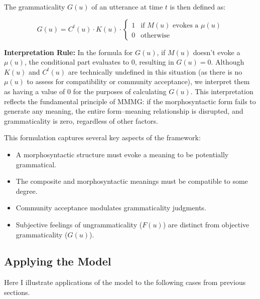 \documentclass[12pt,letterpaper]{article}
\begin{document}
The grammaticality \(G(u)\) of an utterance at time \(t\) is then defined as:

\[
G(u) = C^t(u) \cdot K(u) \cdot \begin{cases}
1 & \text{if } M(u) \text{ evokes a } \mu(u) \\
0 & \text{otherwise}
\end{cases}
\]

\noindent \textbf{Interpretation Rule:} In the formula for \(G(u)\), if \(M(u)\) doesn't evoke a \(\mu(u)\), the conditional part evaluates to 0, resulting in \(G(u) = 0\).  Although \(K(u)\) and \(C^t(u)\) are technically undefined in this situation (as there is no \(\mu(u)\) to assess for compatibility or community acceptance), we interpret them as having a value of 0 for the purposes of calculating \(G(u)\). This interpretation reflects the fundamental principle of MMMG: if the morphosyntactic form fails to generate any meaning, the entire form--meaning relationship is disrupted, and grammaticality is zero, regardless of other factors.

This formulation captures several key aspects of the framework:

\begin{itemize}
    \item A morphosyntactic structure must evoke a meaning to be potentially grammatical.
    \item The composite and morphosyntactic meanings must be compatible to some degree.
    \item Community acceptance modulates grammaticality judgments.
    \item Subjective feelings of ungrammaticality (\(F(u)\)) are distinct from objective grammaticality (\(G(u)\)).
\end{itemize}

\subsection{Applying the Model}

Here I illustrate applications of the model to the following cases from previous sections.
\end{document}
